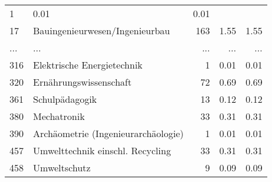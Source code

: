 \begin{longtable}{lXrrr}
          \num{1} &
          \num[round-mode=places,round-precision=2]{0,01} &
          \num[round-mode=places,round-precision=2]{0,01} \\
        17 & \multicolumn{1}{X}{Bauingenieurwesen/Ingenieurbau} & %
          \num{163} &
          \num[round-mode=places,round-precision=2]{1,55} &
          \num[round-mode=places,round-precision=2]{1,55} \\
       ... & ... & ... & ... & ... \\
        316 & \multicolumn{1}{X}{Elektrische Energietechnik} & %
          \num{1} &
          \num[round-mode=places,round-precision=2]{0,01} &
          \num[round-mode=places,round-precision=2]{0,01} \\

        320 & \multicolumn{1}{X}{Ernährungswissenschaft} & %
          \num{72} &
          \num[round-mode=places,round-precision=2]{0,69} &
          \num[round-mode=places,round-precision=2]{0,69} \\

        361 & \multicolumn{1}{X}{Schulpädagogik} & %
          \num{13} &
          \num[round-mode=places,round-precision=2]{0,12} &
          \num[round-mode=places,round-precision=2]{0,12} \\

        380 & \multicolumn{1}{X}{Mechatronik} & %
          \num{33} &
          \num[round-mode=places,round-precision=2]{0,31} &
          \num[round-mode=places,round-precision=2]{0,31} \\

        390 & \multicolumn{1}{X}{Archäometrie (Ingenieurarchäologie)} & %
          \num{1} &
          \num[round-mode=places,round-precision=2]{0,01} &
          \num[round-mode=places,round-precision=2]{0,01} \\

        457 & \multicolumn{1}{X}{Umwelttechnik einschl. Recycling} & %
          \num{33} &
          \num[round-mode=places,round-precision=2]{0,31} &
          \num[round-mode=places,round-precision=2]{0,31} \\

        458 & \multicolumn{1}{X}{Umweltschutz} & %
          \num{9} &
          \num[round-mode=places,round-precision=2]{0,09} &
          \num[round-mode=places,round-precision=2]{0,09} \\


\end{longtable}
